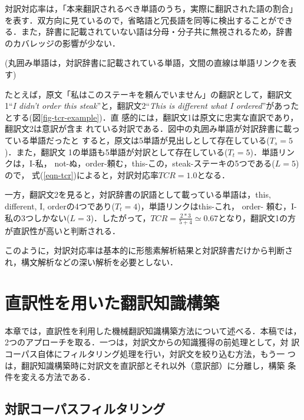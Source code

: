 対訳対応率は，「本来翻訳されるべき単語のうち，実際に翻訳された語の割合」
を表す．双方向に見ているので，省略語と冗長語を同等に検出することができ
る．また，辞書に記載されていない語は分母・分子共に無視されるため，辞書
のカバレッジの影響が少ない．

\begin{figure*}
\begin{center}
\leavevmode\epsfxsize=110mm
\caption{対訳対応率(TCR)による直訳性判定例}
(丸囲み単語は，対訳辞書に記載されている単語，文間の直線は単語リンクを表す)
\label{fig-tcr-example}
\end{center}
\end{figure*}

たとえば，原文「私はこのステーキを頼んでいません」の翻訳として，翻訳文
1``{\it I didn't order this steak}''と，翻訳文2``{\it This is
different what I ordered}''があったとする(図\ref{fig-tcr-example})．直
感的には，翻訳文1は原文に忠実な直訳であり，翻訳文2は意訳が含ま
れている対訳である．図中の丸囲み単語が対訳辞書に載っている単語だったと
すると，原文は5単語が見出しとして存在している($T_s = 5$)．また，翻訳文
1の単語も5単語が対訳として存在している($T_t = 5$)．単語リンクは，I-私，
not-ぬ，order-頼む，this-この，steak-ステーキの5つである($L = 5$)ので，
式(\ref{eqn-tcr})によると，対訳対応率$TCR = 1.0$となる．

一方，翻訳文2を見ると，対訳辞書の訳語として載っている単語は，this,
different, I, orderの4つであり($T_t = 4$)，単語リンクはthis-これ，
order- 頼む，I-私の3つしかない($L = 3$)．したがって，$TCR = \frac{2 *
3}{5 + 4} \simeq 0.67$となり，翻訳文1の方が直訳性が高いと判断される．

このように，対訳対応率は基本的に形態素解析結果と対訳辞書だけから判断さ
れ，構文解析などの深い解析を必要としない．


\section{直訳性を用いた翻訳知識構築}
\label{sec-construction-methods}

本章では，直訳性を利用した機械翻訳知識構築方法について述べる．本稿では，
2つのアプローチを取る．一つは，対訳文からの知識獲得の前処理として，対
訳コーパス自体にフィルタリング処理を行い，対訳文を絞り込む方法，もう一
つは，翻訳知識構築時に対訳文を直訳部とそれ以外（意訳部）に分離し，構築
条件を変える方法である．

\subsection{対訳コーパスフィルタリング}

